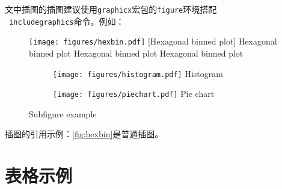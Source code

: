 文中插图的插图建议使用\texttt{graphicx}宏包的\texttt{figure}环境搭配 \\ \texttt{ includegraphics}命令。例如：
\begin{figure}[htbp]
	\centering
	\texttt{[image: figures/hexbin.pdf]}
	[Hexagonal binned plot]
    {Hexagonal binned plot Hexagonal binned plot Hexagonal binned plot}
	\label{fig:hexbin}
\end{figure}
\begin{figure}[htbp]
	\centering
    \begin{subfigure}{0.45\textwidth}
        \centering
	    \texttt{[image: figures/histogram.pdf]}
        {Histogram}
    \end{subfigure}
    \begin{subfigure}{0.45\textwidth}
        \centering
	    \texttt{[image: figures/piechart.pdf]}
        {Pie chart}
    \end{subfigure}
    {Subfigure example}
    \label{fig:subfig}
\end{figure}

插图的引用示例：\autoref{fig:hexbin}是普通插图。

\section{表格示例}

